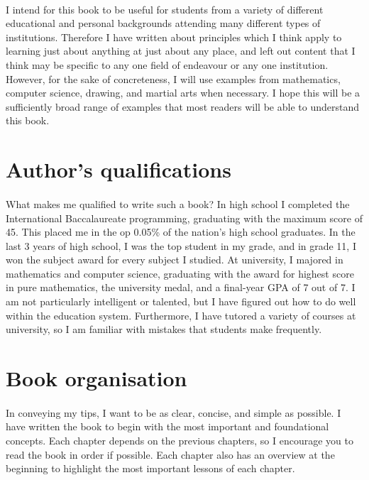 \documentclass[11pt]{memoir}
\begin{document}
	\paragraph{}
	I intend for this book to be useful for students from a variety of different educational
	and personal backgrounds attending many different types of institutions. Therefore I
	have written about principles which I think apply to learning just about anything at
	just about any place, and left out content that I think may be specific to any one field
	of endeavour or any one institution. However, for the sake of concreteness, I will use 
	examples from mathematics, computer science, drawing, and martial arts when necessary. 
	I hope this will be a sufficiently broad range of examples that most readers will be 
	able to understand this book. 
	
	\section{Author's qualifications}
	\paragraph{}
	What makes me qualified to write such a book? In high school I completed the 
	International Baccalaureate programming, graduating with the maximum score of 45.
	This placed me in the op 0.05\% of the nation's high school graduates. In the last
	3 years of high school, I was the top student in my grade, and in grade 11, I won the
	subject award for every subject I studied. At university, I majored in mathematics and
	computer science, graduating with the award for highest score in pure mathematics, the
	university medal, and a final-year GPA of 7 out of 7. I am not particularly intelligent
	or talented, but I have figured out how to do well within the education system. Furthermore, I have tutored a variety of courses at university, so I am familiar with 
	mistakes that students make frequently.
	
	\section{Book organisation}
	\paragraph{}
	In conveying my tips, I want to be as clear, concise, and simple as possible. 
	I have written the book to begin with the most important and foundational concepts. 
	Each chapter depends on the previous chapters, so I encourage you to read the book 
	in order if possible. Each chapter also has an overview at the beginning to highlight the most important lessons of each chapter. 
	
\end{document}
